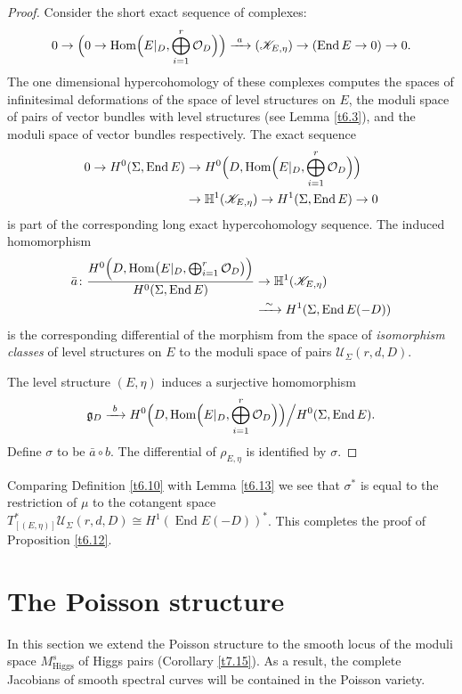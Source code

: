 \documentclass[12pt,a4paper,oneside,english]{smfart}
\theoremstyle{definition}
\theoremstyle{remark}
\DeclareMathOperator{\End}{End}
\DeclareMathOperator{\Hom}{Hom}
\newcommand{\Hig}{\mathrm{Higgs}}
\newcommand{\MHs}{M^{s}_{\Hig}}
\newcommand{\cU}{\mathcal{U}}
\newcommand{\cO}{\mathcal{O}}
\newcommand{\KK}{\mathscr{K}}
\newcommand{\HH}{\mathbb{H}}
\begin{document}
\begin{proof}
Consider the short exact sequence of complexes:
\[
0 \to \Bigl(0 \to \Hom\Bigl(E|_D, \bigoplus_{i=1}^{r} \cO_D\Bigr)\Bigr) \xrightarrow{\ a\ } (\KK_{E, \eta}) \to (\End E \to 0) \to 0.
\]
The one dimensional hypercohomology of these complexes computes the spaces of infinitesimal deformations of the space of level structures on $E$, the moduli space of pairs of vector bundles with level structures (see Lemma \ref{t6.3}), and the moduli space of vector bundles respectively. The exact sequence
\begin{align*}
0 \to H^0(\Sigma, \End E) &\to H^0\Bigl(D, \Hom\Bigl(E|_D, \bigoplus_{i=1}^{r} \cO_D\Bigr)\Bigr) \\
&\to \HH^1(\KK_{E, \eta}) \to H^1(\Sigma, \End E) \to 0
\end{align*}
is part of the corresponding long exact hypercohomology sequence. The induced homomorphism
\begin{align*}
\bar{a} \colon \frac{H^0\Bigl(D, \Hom\bigl(E|_D, \bigoplus_{i=1}^{r} \cO_D\bigr)\Bigr)}{H^0(\Sigma, \End E)}
&\to \HH^1(\KK_{E, \eta}) \\
&\xrightarrow{\ \sim\ } H^1(\Sigma, \End E(-D))
\end{align*}
is the corresponding differential of the morphism from the space of \emph{isomorphism classes} of level structures on $E$ to the moduli space of pairs $\cU_\Sigma(r, d, D)$.

The level structure $(E, \eta)$ induces a surjective homomorphism
\[
\mathfrak{g}_D \xrightarrow{\ b\ } H^0\Bigl(D, \Hom\Bigl(E|_D, \bigoplus_{i=1}^{r} \cO_D\Bigr)\Bigr) \Big/ H^0(\Sigma, \End E).
\]
Define $\sigma$ to be $\bar{a} \circ b$. The differential of $\rho_{E, \eta}$ is identified by $\sigma$.
\end{proof}

Comparing Definition \ref{t6.10} with Lemma \ref{t6.13} we see that $\sigma^*$ is equal to the restriction of $\mu$ to the cotangent space $T^*_{[(E, \eta)]}\cU_\Sigma(r, d, D) \cong H^1(\End E(-D))^*$. This completes the proof of Proposition \ref{t6.12}.

\section{The Poisson structure}\label{sec:7}

In this section we extend the Poisson structure to the smooth locus of the moduli space $\MHs$ of Higgs pairs (Corollary \ref{t7.15}). As a result, the complete Jacobians of smooth spectral curves will be contained in the Poisson variety.
\end{document}
